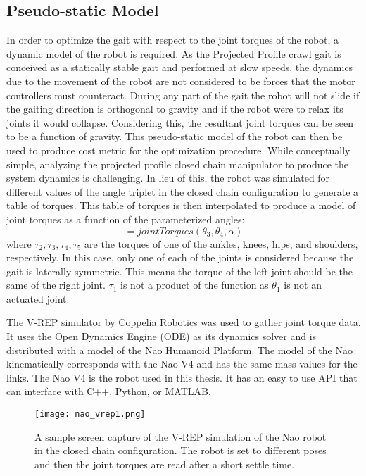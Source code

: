 \subsection{Pseudo-static Model}

In order to optimize the gait with respect to the joint torques of the robot, a dynamic model of the robot is required.
As the Projected Profile crawl gait is conceived as a statically stable gait and performed at slow speeds,
the dynamics due to the movement of the robot are not considered to be forces that the 
motor controllers must counteract. 
During any part of the gait the robot will not slide if the gaiting direction is orthogonal to gravity and
if the robot were to relax its joints it would collapse.
Considering this, the resultant joint torques can be seen to be a function of gravity. 
This pseudo-static model of the robot can then be used to produce cost metric for the optimization procedure.
While conceptually simple, analyzing the projected profile closed chain manipulator to produce the 
system dynamics is challenging.
In lieu of this, the robot was simulated for different values of the angle triplet in the closed chain 
configuration to generate a table of torques. This table of torques is then interpolated to produce
a model of joint torques as a function of the parameterized angles:
\begin{equation}
	[\tau_2, \tau_2, \tau_4, \tau_5] = jointTorques(\theta_3, \theta_4, \alpha)
\end{equation}
where $\tau_2, \tau_3, \tau_4, \tau_5$ are the torques of one of the ankles, knees, hips, and shoulders, respectively.
In this case, only one of each of the joints is considered because the gait is laterally symmetric. This means
the torque of the left joint should be the same of the right joint.
$\tau_1$ is not a product of the function as $\theta_1$ is not an actuated joint.

The V-REP simulator by Coppelia Robotics was used to gather joint torque data. It uses the Open Dynamics Engine (ODE)
as its dynamics solver and is distributed with a model of the Nao Humanoid Platform. The model of the Nao
kinematically corresponds with the Nao V4 and has the same mass values for the links. 
The Nao V4 is the robot used in this thesis.
It has an easy to use API that can interface with C++, Python, or MATLAB.

\begin{figure}
	\texttt{[image: nao\_vrep1.png]}
  	\caption{ A sample screen capture of the V-REP simulation of the Nao robot in the closed
  				chain configuration. The robot is set to different poses and then the joint torques
  				are read after a short settle time.
  			}
  	\label{fig:nao_vrep1}
\end{figure}

